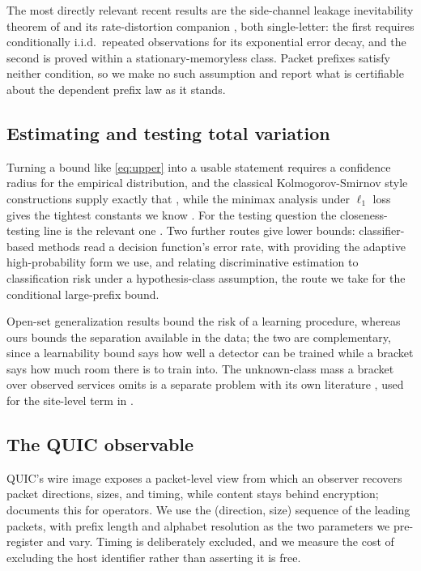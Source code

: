 The most directly relevant recent results are the side-channel leakage
inevitability theorem of \citet{liu2026inevitability} and its rate-distortion
companion \citep{liu2026rate}, both single-letter: the first requires
conditionally i.i.d.\ repeated observations for its exponential error decay, and
the second is proved within a stationary-memoryless class. Packet prefixes
satisfy neither condition, so we make no such assumption and report what is
certifiable about the dependent prefix law as it stands.

\subsection{Estimating and testing total variation}
\label{sec:background/tv_est}

Turning a bound like \eqref{eq:upper} into a usable statement requires a
confidence radius for the empirical distribution, and the classical
Kolmogorov-Smirnov style constructions supply exactly that
\citep{wei2011dkwtwo,reeve2024dkwmassart}, while the minimax analysis under
$\ell_1$ loss gives the tightest constants we know
\citep{han2015l1distribution,jiao2018l1distance}. For the testing question the
closeness-testing line is the relevant one
\citep{chan2013closeness,diakonikolas2020highprob}. Two further routes give lower
bounds: classifier-based methods read a decision function's error rate, with
\citet{michel2020high} providing the adaptive high-probability form we use, and
\citet{tao2024discriminative} relating discriminative estimation to
classification risk under a hypothesis-class assumption, the route we take for the
conditional large-prefix bound.

Open-set generalization results \citep{fang2021learning,garov2025closer} bound
the risk of a learning procedure, whereas ours bounds the separation available in
the data; the two are complementary, since a learnability bound says how well a
detector can be trained while a bracket says how much room there is to train
into. The unknown-class mass a bracket over observed services omits is a separate
problem with its own literature \citep{orlitsky2016optimal,eriksson2026unseen},
used for the site-level term in .

\subsection{The QUIC observable}
\label{sec:background/quic}

QUIC's wire image exposes a packet-level view from which an observer recovers
packet directions, sizes, and timing, while content stays behind encryption;
\citet{kuhlewind2022rfc} documents this for operators. We use the
(direction, size) sequence of the leading packets, with prefix length and
alphabet resolution as the two parameters we pre-register and vary. Timing is
deliberately excluded, and we measure the cost of excluding the host identifier
rather than asserting it is free.
